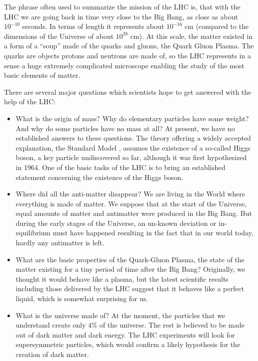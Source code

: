 The phrase often used to summarize the mission of the LHC is, that
with the LHC we are going back in time very close to the Big Bang,
as close as about $10^{-10}$ seconds. In terms of length it represents
about $10^{-16}$ cm (compared to the dimensions of the Universe of about
$10^{28}$ cm). At this scale, the matter existed in a form of a ``soup''
made of the quarks and gluons, the Quark Gluon Plasma. The quarks
are objects protons and neutrons are made of, so the LHC represents
in a sense a huge extremely complicated microscope enabling the
study of the most basic elements of matter.

There are several major questions which scientists hope to
get answered with the help of the LHC:

\begin{itemize}
\item What is the origin of mass? Why do elementary particles have
some weight? And why do some particles have no mass at all? At
present, we have no established answers to these questions. The
theory offering a widely accepted explanation, the Standard Model
\cite{Standard}, assumes the existence of a so-called Higgs boson, a key particle
undiscovered so far, although it was first hypothesized in 1964. One
of the basic tasks of the LHC is to bring an established statement
concerning the existence of the Higgs boson.

\item Where did all the anti-matter disappear? We are living in the
World where everything is made of matter. We suppose that at the
start of the Universe, equal amounts of matter and antimatter were
produced in the Big Bang. But during the early stages of the
Universe, an un-known deviation or in-equilibrium must have happened
resulting in the fact that in our world today, hardly any antimatter
is left.

\item What are the basic properties of the Quark-Gluon Plasma, the
state of the matter existing for a tiny period of time after the Big
Bang? Originally, we thought it would behave like a plasma, but the
latest scientific results including those delivered by the LHC
suggest that it behaves like a perfect liquid,
which is somewhat surprising for us.

\item What is the universe made of? At the moment, the particles that we understand 
create only 4\% of the universe. The rest is believed to be made out of dark matter
and dark energy. The LHC experiments will look for supersymmetric particles, which
 would confirm a likely hypothesis for the creation of dark matter.
\end{itemize}

